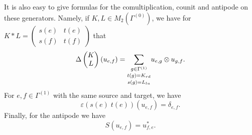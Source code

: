 It is also easy to give formulas for the comultiplication, counit and antipode on these generators. Namely, if $K,L  \in M_2(\Gamma^{(0)})$, we have for $K*L = \begin{pmatrix} s(e) & t(e)\\ s(f)& t(f)\end{pmatrix}$ that \[\Delta\begin{pmatrix} K \\ L\end{pmatrix}(u_{e,f}) = \underset{s(g) = L_{lu}}{\underset{t(g) = K_{rd}}{\sum_{g\in\Gamma^{(1)}}}} u_{e,g}\otimes u_{g,f}.\] For $e,f\in \Gamma^{(1)}$ with the same source and target, we have
\[\varepsilon(s(e)\;t(e))(u_{e,f}) = \delta_{e,f}.\]
Finally, for the antipode we have \[S(u_{e,f}) = u_{f,e}^*.\]



